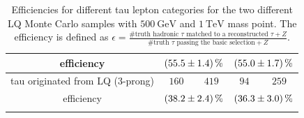 \begin{table}
\begin{tabular*}{\linewidth}{@{\extracolsep{\fill}}ccccc}
		efficiency                  & \multicolumn{2}{c}{$\SI{55.5\pm 1.4}{\percent}$}   & \multicolumn{2}{c}{$\SI{55.0\pm 1.7}{\percent}$}
		\\
		\hline
                tau originated from LQ (3-prong)& $160$        & $419$         & $94$          & $259$
		\\
		efficiency                  & \multicolumn{2}{c}{$\SI{38.2\pm 2.4}{\percent}$}   & \multicolumn{2}{c}{$\SI{36.3\pm 3.0}{\percent}$}
		\\
		\\
		\hline
		\hline
		\end{tabular*}
		\caption[Efficiencies for the two LQ samples with $\SI{500}{\giga\electronvolt}$ and $\SI{1}{\tera\electronvolt}$ mass point.]{Efficiencies for different tau lepton categories for the two different LQ Monte Carlo samples with $\SI{500}{\giga\electronvolt}$ and $\SI{1}{\tera\electronvolt}$ mass point. The efficiency is defined as $\epsilon=\frac{\text{\#truth hadronic }\tau\text{ matched to a reconstructed }\tau+Z}{\text{\#truth }\tau\text{ passing the basic selection}+Z}$.}
		\label{LQEffTable}
                \renewcommand{\arraystretch}{1}
                \end{table}
